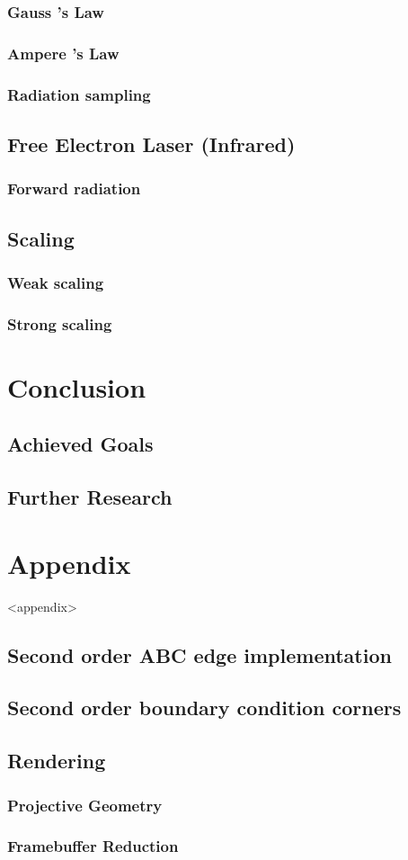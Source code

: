 \documentclass[10pt]{report}
\let\Chapter\chapter
\def\chapter{\addtocontents{lol}{\protect\addvspace{10pt}}\Chapter}
\begin{document}
\subsection{Gauss 's Law}
\subsection{Ampere 's Law}
\subsection{Radiation sampling}
\section{Free Electron Laser (Infrared)}
\subsection{Forward radiation}
\section{Scaling}
\subsection{Weak scaling } \label{weak_scaling_subsection}
\subsection{Strong scaling } \label{strong_scaling_subsection}
\chapter{Conclusion}
\section{Achieved Goals}
\section{Further Research}
\chapter{Appendix} <appendix>
\section{Second order ABC edge implementation } \label{abc2_edge_implementation}
\section{Second order boundary condition corners }
\section{Rendering}
\subsection{Projective Geometry}
\subsection{Framebuffer Reduction}


\end{document}
